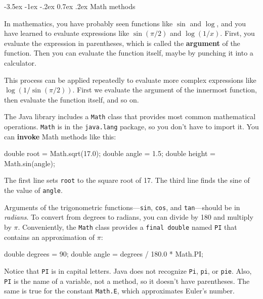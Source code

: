 \documentclass[12pt]{book}
\makeatletter
\theoremstyle{exercise}
\newcommand{\java}[1]{\verb"#1"}
\renewcommand{\section}{\@startsection {section}{1}{\z@}%
    {-3.5ex \@plus -1ex \@minus -.2ex}%
    {0.7ex \@plus.2ex}%
    {\normalfont\Large\bfseries}}
\newcommand{\java}[1]{\lstinline{#1}} %
\makeatother
\begin{document}
\section{Math methods}


In mathematics, you have probably seen functions like $\sin$ and $\log$, and you have learned to evaluate expressions like $\sin(\pi/2)$ and $\log(1/x)$.
First, you evaluate the expression in parentheses, which is called the {\bf argument} of the function.
Then you can evaluate the function itself, maybe by punching it into a calculator.

This process can be applied repeatedly to evaluate more complex expressions like $\log(1/\sin(\pi/2))$.
First we evaluate the argument of the innermost function, then evaluate the function itself, and so on.


The Java library includes a \java{Math} class that provides most common mathematical operations.
\java{Math} is in the \java{java.lang} package, so you don't have to import it.
You can {\bf invoke} Math methods like this:

\begin{code}
    double root = Math.sqrt(17.0);
    double angle = 1.5;
    double height = Math.sin(angle);
\end{code}

The first line sets \java{root} to the square root of 17.
The third line finds the sine of the value of \java{angle}.


Arguments of the trigonometric functions---\java{sin}, \java{cos}, and \java{tan}---should be in {\em radians}.
To convert from degrees to radians, you can divide by 180 and multiply by $\pi$.
Conveniently, the \java{Math} class provides a \java{final double} named \java{PI} that contains an approximation of $\pi$:

\begin{code}
    double degrees = 90;
    double angle = degrees / 180.0 * Math.PI;
\end{code}

Notice that \java{PI} is in capital letters.
Java does not recognize \java{Pi}, \java{pi}, or \java{pie}.
Also, \java{PI} is the name of a variable, not a method, so it doesn't have parentheses.
The same is true for the constant \java{Math.E}, which approximates Euler's number.
\end{document}
